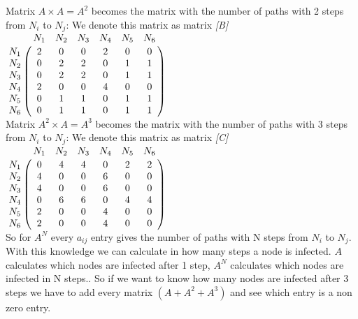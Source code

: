 Matrix $A \times A = A^{2}$ becomes the matrix with the number of paths with 2 steps from $N_{i}$ to $N_{j}$: We denote this matrix as matrix \textit{[B]}\\


$
\bordermatrix{
         & N_1		& N_2	& N_3	& N_4 	& N_5	&N_6     \cr
    N_1   & 2		& 0		& 0		& 2		& 0		& 0	     \cr
    N_2   & 0		& 2		& 2		& 0		& 1		& 1	     \cr
    N_3   & 0		& 2		& 2		& 0		& 1		& 1	     \cr
    N_4   & 2		& 0		& 0		& 4		& 0		& 0	     \cr
	N_5   & 0		& 1		& 1		& 0		& 1		& 1	     \cr
	N_6   & 0		& 1		& 1		& 0		& 1		& 1	     \cr
}$
\\

Matrix $A^{2} \times A = A^{3}$ becomes the matrix with the number of paths with 3 steps from $N_{i}$ to $N_{j}$: We denote this matrix as matrix \textit{[C]}\\


$
\bordermatrix{
         & N_1		& N_2	& N_3	& N_4 	& N_5	&N_6     \cr
    N_1   & 0		& 4		& 4		& 0		& 2		& 2	     \cr
    N_2   & 4		& 0		& 0		& 6		& 0		& 0	     \cr
    N_3   & 4		& 0		& 0		& 6		& 0		& 0	     \cr
    N_4   & 0		& 6		& 6		& 0		& 4		& 4	     \cr
	N_5   & 2		& 0		& 0		& 4		& 0		& 0	     \cr
	N_6   & 2		& 0		& 0		& 4		& 0		& 0	     \cr
}$ 
\\

So for $A^{N}$ every $a_{ij}$ entry gives the number of paths with N steps from $N_{i}$ to $N_{j}$.\\

With this knowledge we can calculate in how many steps a node is infected. $A$ calculates which nodes are infected after 1 step, $A^{N}$ calculates which nodes are infected in N steps.. So if we want to know how many nodes are infected after 3 steps we have to add every matrix $(A + A^{2} + A^{3}) $ and see which entry is a non zero entry. 

